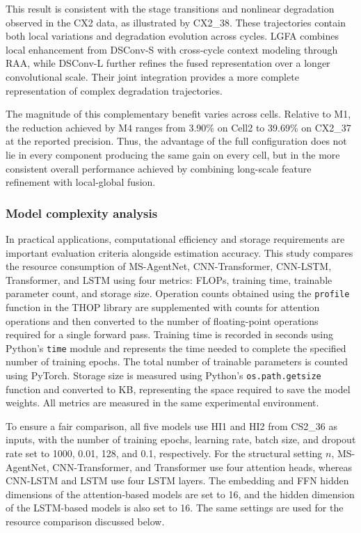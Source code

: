 This result is consistent with the stage transitions and nonlinear degradation observed in the CX2 data, as illustrated by CX2\_38. These trajectories contain both local variations and degradation evolution across cycles. LGFA combines local enhancement from DSConv-S with cross-cycle context modeling through RAA, while DSConv-L further refines the fused representation over a longer convolutional scale. Their joint integration provides a more complete representation of complex degradation trajectories.

The magnitude of this complementary benefit varies across cells. Relative to M1, the reduction achieved by M4 ranges from 3.90\% on Cell2 to 39.69\% on CX2\_37 at the reported precision. Thus, the advantage of the full configuration does not lie in every component producing the same gain on every cell, but in the more consistent overall performance achieved by combining long-scale feature refinement with local-global fusion.

\clearpage

\FloatBarrier

\subsubsection{Model complexity analysis}

In practical applications, computational efficiency and storage requirements are important evaluation criteria alongside estimation accuracy\cite{ref77}. This study compares the resource consumption of MS-AgentNet, CNN-Transformer, CNN-LSTM, Transformer, and LSTM using four metrics: FLOPs, training time, trainable parameter count, and storage size. Operation counts obtained using the \texttt{profile} function in the THOP library are supplemented with counts for attention operations and then converted to the number of floating-point operations required for a single forward pass. Training time is recorded in seconds using Python's \texttt{time} module and represents the time needed to complete the specified number of training epochs. The total number of trainable parameters is counted using PyTorch. Storage size is measured using Python's \texttt{os.path.getsize} function and converted to KB, representing the space required to save the model weights. All metrics are measured in the same experimental environment.

To ensure a fair comparison, all five models use HI1 and HI2 from CS2\_36 as inputs, with the number of training epochs, learning rate, batch size, and dropout rate set to 1000, 0.01, 128, and 0.1, respectively. For the structural setting $n$, MS-AgentNet, CNN-Transformer, and Transformer use four attention heads, whereas CNN-LSTM and LSTM use four LSTM layers. The embedding and FFN hidden dimensions of the attention-based models are set to 16, and the hidden dimension of the LSTM-based models is also set to 16. The same settings are used for the resource comparison discussed below.

